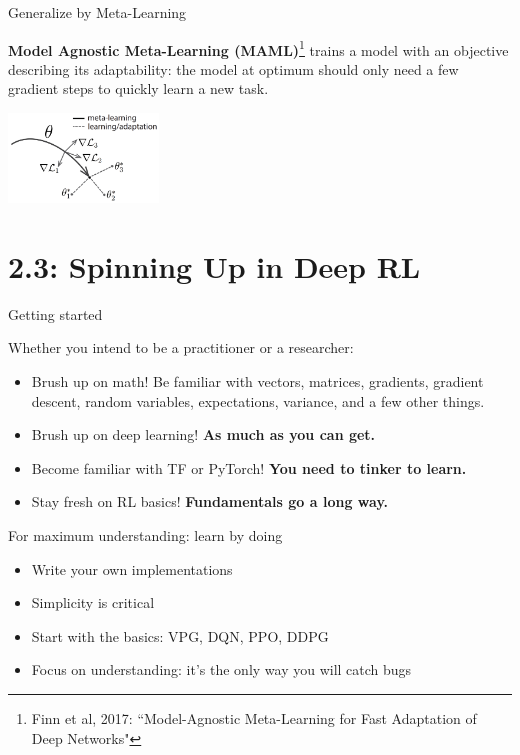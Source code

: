 \documentclass[9pt]{beamer}
\begin{document}
\begin{frame}{Generalize by Meta-Learning}

\textbf{Model Agnostic Meta-Learning (MAML)}\footnote{Finn et al, 2017: ``Model-Agnostic Meta-Learning for Fast Adaptation of Deep Networks"} trains a model with an objective describing its adaptability: the model at optimum should only need a few gradient steps to quickly learn a new task.

\begin{center}
\includegraphics[width=4cm]{p2-maml}
\end{center}

\end{frame}

\section{2.3: Spinning Up in Deep RL}

\begin{frame}{Getting started}

Whether you intend to be a practitioner or a researcher:
\begin{itemize}
\item Brush up on math! Be familiar with vectors, matrices, gradients, gradient descent, random variables, expectations, variance, and a few other things.
\item Brush up on deep learning! \textbf{As much as you can get.}
\item Become familiar with TF or PyTorch! \textbf{You need to tinker to learn.}
\item Stay fresh on RL basics! \textbf{Fundamentals go a long way.}
\end{itemize}

\end{frame}

\begin{frame}{For maximum understanding: learn by doing}

\begin{itemize}
\item Write your own implementations
\item Simplicity is critical
\item Start with the basics: VPG, DQN, PPO, DDPG
\item Focus on understanding: it's the only way you will catch bugs
\end{itemize}
\end{frame}
\end{document}

